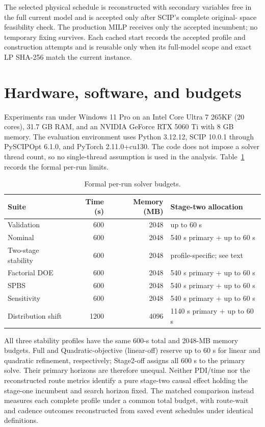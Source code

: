\documentclass[11pt]{article}
\begin{document}
The selected physical schedule is reconstructed with secondary variables free
in the full current model and is accepted only after SCIP's complete original-
space feasibility check. The production MILP receives only the accepted
incumbent; no temporary fixing survives. Each cached start records the accepted
profile and construction attempts and is reusable only when its full-model
scope and exact LP SHA-256 match the current instance.

\section{Hardware, software, and budgets}

Experiments ran under Windows 11 Pro on an Intel Core Ultra 7 265KF
(20 cores), 31.7 GB RAM, and an NVIDIA GeForce RTX 5060 Ti with 8 GB memory.
The evaluation environment uses Python 3.12.12, SCIP 10.0.1 through
PySCIPOpt 6.1.0, and PyTorch 2.11.0+cu130. The code does not impose a solver thread count, so no
single-thread assumption is used in the analysis.
Table~\ref{tab:budgets} records the formal per-run limits.

\begin{table}[htbp]
\centering
\caption{Formal per-run solver budgets.}
\label{tab:budgets}
\begin{tabular}{lrrl}
\toprule
Suite & Time (s) & Memory (MB) & Stage-two allocation \\
\midrule
Validation & 600 & 2048 & up to 60 s \\
Nominal & 600 & 2048 & 540 s primary + up to 60 s \\
Two-stage stability & 600 & 2048 & profile-specific; see text \\
Factorial DOE & 600 & 2048 & 540 s primary + up to 60 s \\
SPBS & 600 & 2048 & 540 s primary + up to 60 s \\
Sensitivity & 600 & 2048 & 540 s primary + up to 60 s \\
Distribution shift & 1200 & 4096 & 1140 s primary + up to 60 s \\
\bottomrule
\end{tabular}
\end{table}

All three stability profiles have the same 600-s total and 2048-MB memory
budgets. Full and Quadratic-objective (linear-off) reserve up to 60 s for
linear and quadratic refinement, respectively; Stage2-off assigns all 600 s
to the primary solve. Their primary horizons are therefore unequal. Neither
PDI/time nor the reconstructed route metrics identify a pure stage-two causal
effect holding the stage-one incumbent and search horizon fixed. The matched
comparison instead measures each complete profile under a common total budget,
with route-wait and cadence outcomes reconstructed from saved event schedules
under identical definitions.
\end{document}
